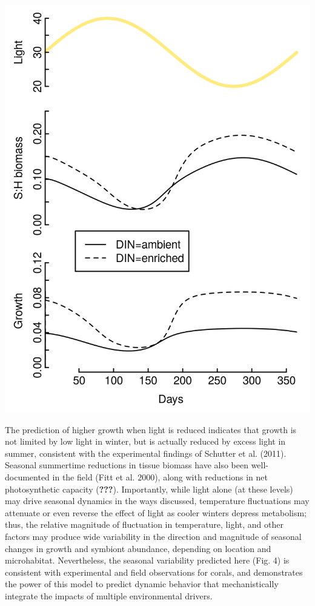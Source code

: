 \documentclass[]{elsarticle} %
\makeatletter
\def\maxwidth{\ifdim\Gin@nat@width>\linewidth\linewidth
\else\Gin@nat@width\fi}
\let\Oldincludegraphics\includegraphics
\renewcommand{\includegraphics}[1]{\Oldincludegraphics[width=\maxwidth]{#1}}
\makeatother
\begin{document}
\includegraphics{../img/Fig4.png}

The prediction of higher growth when light is reduced indicates that
growth is not limited by low light in winter, but is actually reduced by
excess light in summer, consistent with the experimental findings of
Schutter et al. (2011). Seasonal summertime reductions in tissue biomass
have also been well-documented in the field (Fitt et al. 2000), along
with reductions in net photosynthetic capacity (\textbf{???}).
Importantly, while light alone (at these levels) may drive seasonal
dynamics in the ways discussed, temperature fluctuations may attenuate
or even reverse the effect of light as cooler winters depress
metabolism; thus, the relative magnitude of fluctuation in temperature,
light, and other factors may produce wide variability in the direction
and magnitude of seasonal changes in growth and symbiont abundance,
depending on location and microhabitat. Nevertheless, the seasonal
variability predicted here (Fig. 4) is consistent with experimental and
field observations for corals, and demonstrates the power of this model
to predict dynamic behavior that mechanistically integrate the impacts
of multiple environmental drivers.
\end{document}

